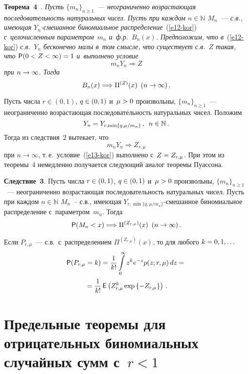 \begin{multicols}{2}
\smallskip

\noindent
\textbf{Теорема~4}~\cite{Korolev2016}. \textit{Пусть $\{m_n\}_{n\ge1}$~---
неограниченно возрастающая последовательность натуральных чисел.
Пусть при каждом $n\in\mathbb{N}$ $M_n$~--- с.в., имеющая
$Y_n$-сме\-шан\-ное биномиальное распределение}~(\ref{e12-kor}) 
\textit{с~це\-ло\-чис\-лен\-ным
параметром~$m_n$ и~ф.р.~$B_n(x)$. Предположим, что в}~(\ref{e12-kor}) 
\textit{с.в.~$Y_n$ бесконечно малы в~том смысле, что существует с.в.~$Z$ такая,
что ${\sf P}(0\hm< Z\hm<\infty)\hm=1$ и~выполнено условие}
\begin{equation}
m_nY_n\Longrightarrow Z \label{e13-kor}
\end{equation}
\textit{при $n\hm\to\infty$. Тогда}
$$
B_n(x)\Longrightarrow \Pi^{(Z)}(x) \enskip (n\to\infty)\,.
$$

\smallskip

Пусть числа $r\in(0,1)$, $q\hm\in(0,1)$ и~$\mu\hm>0$ произвольны,
$\{m_n\}_{n\ge1}$~--- неограниченно возрастающая последовательность
натуральных чисел. Положим
$$
Y_n=Y_{r,\min\{q,\mu/m_n\}}\,,\enskip n\in\mathbb{N}\,.
$$
Тогда из следствия~2 вытекает, что
$$
m_nY_n\Longrightarrow Z_{r,\mu}
$$
при $n\to\infty$, т.\,е.\ условие~(\ref{e13-kor}) выполнено с~$Z\hm=Z_{r,\mu}$.
При этом из теоремы~4 немедленно получается следующий аналог теоремы
Пуассона.

\smallskip

\noindent
\textbf{Следствие~3}. {Пусть числа $r\hm\in(0,1)$, $q\hm\in(0,1)$ 
и~$\mu\hm>0$ произвольны, $\{m_n\}_{n\ge1}$~--- неограниченно возрастающая
последовательность натуральных чисел. Пусть при каждом
$n\in\mathbb{N}$ $M_n$~-- с.в., имеющая
$Y_{r,\min\{q,\mu/m_n\}}$-сме\-шан\-ное биномиальное распределение 
с~параметром~$m_n$. Тогда}
$$
{\sf P}(M_n<x)\Longrightarrow \Pi^{(Z_{r,\mu})}(x)\enskip
(n\to\infty)\,.
$$

\smallskip

Если $P_{r,\mu}$~--- с.в.\ с~распределением $\Pi^{(Z_{r,\mu})}(x)$,
то для любого $k\hm=0,1,\ldots$
\begin{multline*}
{\sf P}(P_{r,\mu}=k)=\displaystyle\frac{\displaystyle 1\mathstrut}{\displaystyle k!\mathstrut}\int\limits_{0}^{\infty}z^ke^{-z}p(z;r,\mu)\,dz={}\\
{}=
\displaystyle\frac{\displaystyle 1\mathstrut}{\displaystyle k!\mathstrut}\,{\sf E}\left(Z_{r,\mu}^k\exp\left\{-Z_{r,\mu}\right\}\right)\,.
\end{multline*}

\section{Предельные теоремы для отрицательных биномиальных случайных сумм 
с~$r<1$}


\end{multicols}
